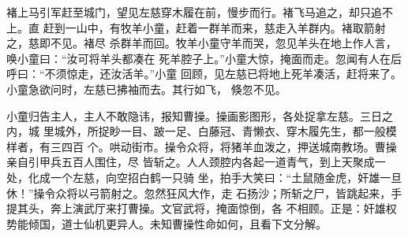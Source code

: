褚上马引军赶至城门，望见左慈穿木履在前，慢步而行。褚飞马追之，却只追不上。直
赶到一山中，有牧羊小童，赶着一群羊而来，慈走入羊群内。褚取箭射之，慈即不见。褚尽
杀群羊而回。牧羊小童守羊而哭，忽见羊头在地上作人言，唤小童曰：“汝可将羊头都凑在
死羊腔子上。”小童大惊，掩面而走。忽闻有人在后呼曰：“不须惊走，还汝活羊。”小童
回顾，见左慈已将地上死羊凑活，赶将来了。小童急欲问时，左慈已拂袖而去。其行如飞，
倏忽不见。

小童归告主人，主人不敢隐讳，报知曹操。操画影图形，各处捉拿左慈。三日之内，城
里城外，所捉眇一目、跛一足、白藤冠、青懒衣、穿木履先生，都一般模样者，有三四百
个。哄动街市。操令众将，将猪羊血泼之，押送城南教场。曹操亲自引甲兵五百人围住，尽
皆斩之。人人颈腔内各起一道青气，到上天聚成一处，化成一个左慈，向空招白鹤一只骑
坐，拍手大笑曰：“土鼠随金虎，奸雄一旦休！”操令众将以弓箭射之。忽然狂风大作，走
石扬沙；所斩之尸，皆跳起来，手提其头，奔上演武厅来打曹操。文官武将，掩面惊倒，各
不相顾。正是：奸雄权势能倾国，道士仙机更异人。未知曹操性命如何，且看下文分解。